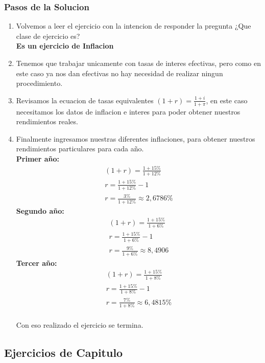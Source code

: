 \subsubsection*{Pasos de la Solucion}
\begin{enumerate}
    \item Volvemos a leer el ejercicio con la intencion de responder la pregunta ¿Que clase de ejercicio es?\\
    \textbf{Es un ejercicio de Inflacion}
    \item Tenemos que trabajar unicamente con tasas de interes efectivas, pero como en este caso ya nos dan efectivas no hay necesidad de realizar ningun procedimiento.
    \item Revisamos la ecuacion de tasas equivalentes $(1+r)=\frac{1+i}{1+\pi}$, en este caso necesitamos  los datos de inflacion e interes para poder obtener nuestros rendimientos reales.
    \item Finalmente ingresamos nuestras diferentes inflaciones, para obtener nuestros rendimientos particulares para cada año.\\
    \textbf{Primer año:}
    \begin{align*}
        (1+r)=\frac{1+15\%}{1+12\%}\\
        r=\frac{1+15\%}{1+12\%}-1\\
        r=\frac{3\%}{1+12\%}\approx2,6786\%
    \end{align*}
    \textbf{Segundo año:}
    \begin{align*}
        (1+r)=\frac{1+15\%}{1+6\%}\\
        r=\frac{1+15\%}{1+6\%}-1\\
        r=\frac{9\%}{1+6\%}\approx8,4906
    \end{align*}
    \textbf{Tercer año:}
    \begin{align*}
        (1+r)=\frac{1+15\%}{1+8\%}\\
        r=\frac{1+15\%}{1+8\%}-1\\
        r=\frac{7\%}{1+8\%}\approx6,4815\%
    \end{align*}
    \text{ }\\
    Con eso realizado el ejercicio se termina.
\end{enumerate}
\subsection{Ejercicios de Capitulo}
